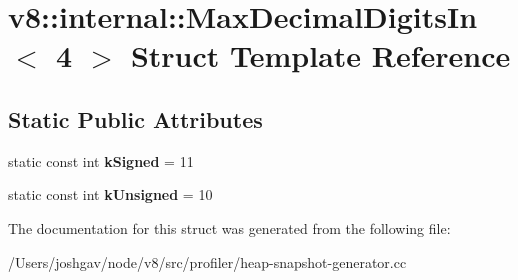 \hypertarget{structv8_1_1internal_1_1_max_decimal_digits_in_3_014_01_4}{}\section{v8\+:\+:internal\+:\+:Max\+Decimal\+Digits\+In$<$ 4 $>$ Struct Template Reference}
\label{structv8_1_1internal_1_1_max_decimal_digits_in_3_014_01_4}
\subsection*{Static Public Attributes}
\begin{DoxyCompactItemize}
\item 
static const int {\bfseries k\+Signed} = 11\hypertarget{structv8_1_1internal_1_1_max_decimal_digits_in_3_014_01_4_a337b121e0c27c67f824a4c8712ba1298}{}\label{structv8_1_1internal_1_1_max_decimal_digits_in_3_014_01_4_a337b121e0c27c67f824a4c8712ba1298}

\item 
static const int {\bfseries k\+Unsigned} = 10\hypertarget{structv8_1_1internal_1_1_max_decimal_digits_in_3_014_01_4_a9d173ab24eb5214a977edd4832757639}{}\label{structv8_1_1internal_1_1_max_decimal_digits_in_3_014_01_4_a9d173ab24eb5214a977edd4832757639}

\end{DoxyCompactItemize}


The documentation for this struct was generated from the following file\+:\begin{DoxyCompactItemize}
\item 
/\+Users/joshgav/node/v8/src/profiler/heap-\/snapshot-\/generator.\+cc\end{DoxyCompactItemize}
